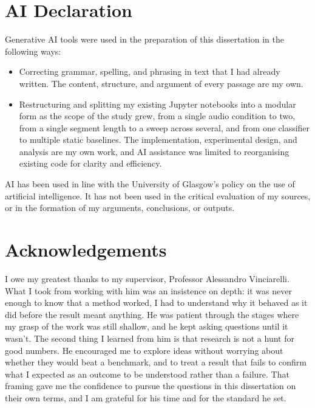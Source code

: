 \documentclass{mproj}
\begin{document}
\newpage
\section*{AI Declaration}

Generative AI tools were used in the preparation of this dissertation in the following ways:

\begin{itemize}
  \item Correcting grammar, spelling, and phrasing in text that I had already written. The content, structure, and argument of every passage are my own.
  \item Restructuring and splitting my existing Jupyter notebooks into a modular form as the scope of the study grew, from a single audio condition to two, from a single segment length to a sweep across several, and from one classifier to multiple static baselines. The implementation, experimental design, and analysis are my own work, and AI assistance was limited to reorganising existing code for clarity and efficiency.
\end{itemize}

AI has been used in line with the University of Glasgow's policy on the use of artificial intelligence. It has not been used in the critical evaluation of my sources, or in the formation of my arguments, conclusions, or outputs.


\newpage
\section*{Acknowledgements}

I owe my greatest thanks to my supervisor, Professor Alessandro Vinciarelli. What I took from working with him was an insistence on depth: it was never enough to know that a method worked, I had to understand why it behaved as it did before the result meant anything. He was patient through the stages where my grasp of the work was still shallow, and he kept asking questions until it wasn't. The second thing I learned from him is that research is not a hunt for good numbers. He encouraged me to explore ideas without worrying about whether they would beat a benchmark, and to treat a result that fails to confirm what I expected as an outcome to be understood rather than a failure. That framing gave me the confidence to pursue the questions in this dissertation on their own terms, and I am grateful for his time and for the standard he set.
\end{document}

